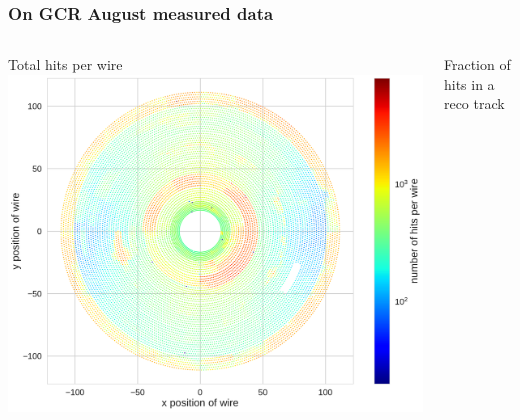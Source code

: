 \documentclass[18pt]{beamer}
\begin{document}
\begin{frame}
  \frametitle{On GCR August measured data}
  \begin{columns}
    \begin{column}{0.5\textwidth}
      \centering
      Total hits per wire
      \includegraphics[width=1.\textwidth]{figures/hit_efficiency_by_wire/total_hits_per_wire.pdf}
    \end{column}
    \begin{column}{0.5\textwidth}
      \centering
      Fraction of hits in a reco track

\end{column}
\end{columns}
\end{frame}
\end{document}
